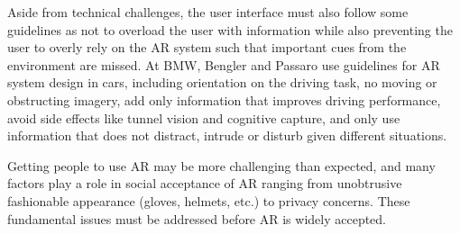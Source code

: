 \documentclass[preprint,12pt]{elsarticle}
\begin{document}

Aside from technical challenges, the user interface must also follow some guidelines as not to overload the user with information while also preventing the user to overly rely on the AR system such that important cues from the environment are missed\cite{vlahakis2001archeoguide}. At BMW, Bengler and Passaro use guidelines for AR system design in cars, including orientation on the driving task, no moving or obstructing imagery, add only information that improves driving performance, avoid side effects like tunnel vision and cognitive capture, and only use information that does not distract, intrude or disturb given different situations.


Getting people to use AR may be more challenging than expected, and many factors play a role in social acceptance of AR ranging from unobtrusive fashionable appearance (gloves, helmets, etc.) to privacy concerns. These fundamental issues must be addressed before AR is widely accepted\cite{hughes2005mixed}.
\end{document}
